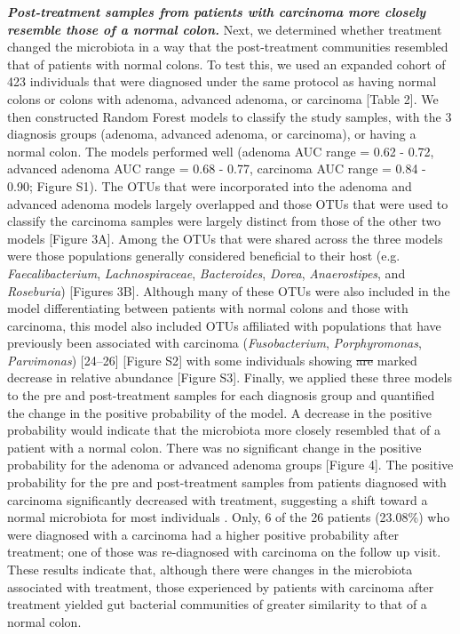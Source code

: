 \documentclass[12pt,]{article}
\providecommand{\DIFaddtex}[1]{{\protect\color{blue}\uwave{#1}}} %
\providecommand{\DIFdeltex}[1]{{\protect\color{red}\sout{#1}}}                      %
\providecommand{\DIFaddbegin}{} %
\providecommand{\DIFaddend}{} %
\providecommand{\DIFdelbegin}{} %
\providecommand{\DIFdelend}{} %
\providecommand{\DIFadd}[1]{\texorpdfstring{\DIFaddtex{#1}}{#1}} %
\providecommand{\DIFdel}[1]{\texorpdfstring{\DIFdeltex{#1}}{}} %
\begin{document}
\textbf{\emph{Post-treatment samples from patients with carcinoma more
closely resemble those of a normal colon.}} Next, we determined whether
treatment changed the microbiota in a way that the post-treatment
communities resembled that of patients with normal colons. To test this,
we used an expanded cohort of 423 individuals that were diagnosed under
the same protocol as having normal colons or colons with adenoma,
advanced adenoma, or carcinoma {[}Table 2{]}. We then constructed Random
Forest models to classify the study samples, with the 3 diagnosis groups
(adenoma, advanced adenoma, or carcinoma), or having a normal colon. The
models performed well (adenoma AUC range = 0.62 - 0.72, advanced adenoma
AUC range = 0.68 - 0.77, carcinoma AUC range = 0.84 - 0.90; Figure S1).
The OTUs that were incorporated into the adenoma and advanced adenoma
models largely overlapped and those OTUs that were used to classify the
carcinoma samples were largely distinct from those of the other two
models {[}Figure 3A{]}. Among the OTUs that were shared across the three
models were those populations generally considered beneficial to their
host (e.g. \emph{Faecalibacterium}, \emph{Lachnospiraceae},
\emph{Bacteroides}, \emph{Dorea}, \emph{Anaerostipes}, and
\emph{Roseburia}) {[}Figures 3B{]}. Although many of these OTUs were
also included in the model differentiating between patients with normal
colons and those with carcinoma, this model also included OTUs
affiliated with populations that have previously been associated with
carcinoma (\emph{Fusobacterium}, \emph{Porphyromonas},
\emph{Parvimonas}) {[}24--26{]} {[}Figure S2{]} with some individuals
showing \DIFdelbegin \DIFdel{are }\DIFdelend \DIFaddbegin \DIFadd{a }\DIFaddend marked decrease in relative abundance {[}Figure S3{]}.
Finally, we applied these three models to the pre and post-treatment
samples for each diagnosis group and quantified the change in the
positive probability of the model. A decrease in the positive
probability would indicate that the microbiota more closely resembled
that of a patient with a normal colon. There was no significant change
in the positive probability for the adenoma or advanced adenoma groups
\DIFaddbegin \DIFadd{(P-value \textgreater{} 0.05) }\DIFaddend {[}Figure 4{]}. The positive probability
for the pre and post-treatment samples from patients diagnosed with
carcinoma significantly decreased with treatment, suggesting a shift
toward a normal microbiota for most individuals \DIFaddbegin \DIFadd{(P-value = 0.02)}\DIFaddend . Only,
6 of the 26 patients (23.08\%) who were diagnosed with a carcinoma had a
higher positive probability after treatment; one of those was
re-diagnosed with carcinoma on the follow up visit. These results
indicate that, although there were changes in the microbiota associated
with treatment, those experienced by patients with carcinoma after
treatment yielded gut bacterial communities of greater similarity to
that of a normal colon.
\end{document}
